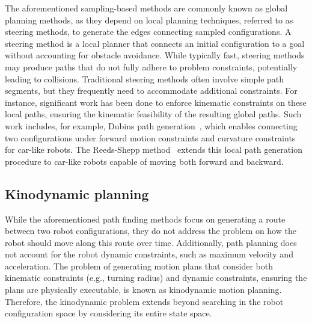 
The aforementioned sampling-based methods are commonly known as global planning methods, as they depend on local planning techniques, referred to as steering methods, to generate the edges connecting sampled configurations. 
A steering method is a local planner that connects an initial configuration to a goal without accounting for obstacle avoidance. 
While typically fast, steering methods may produce paths that do not fully adhere to problem constraints, potentially leading to collisions.
Traditional steering methods often involve simple path segments, but they frequently need to accommodate additional constraints.
For instance, significant work has been done to enforce kinematic constraints on these local paths, ensuring the kinematic feasibility of the resulting global paths.
Such work includes, for example, Dubins path generation~\cite{cDubins}, which enables connecting two configurations under forward motion constraints and curvature constraints for car-like robots. 
The Reeds-Shepp method~\cite{cReeds} extends this local path generation procedure to car-like robots capable of moving both forward and backward.

\subsection{Kinodynamic planning}

While the aforementioned path finding methods focus on generating a route between two robot configurations, they do not address the problem on how the robot should move along this route over time.
Additionally, path planning does not account for the robot dynamic constraints, such as maximum velocity and acceleration. 
The problem of generating motion plans that consider both kinematic constraints (e.g., turning radius) and dynamic constraints, ensuring the plans are physically executable, is known as kinodynamic motion planning.
Therefore, the kinodynamic problem extends beyond searching in the robot configuration space by considering its entire state space.

